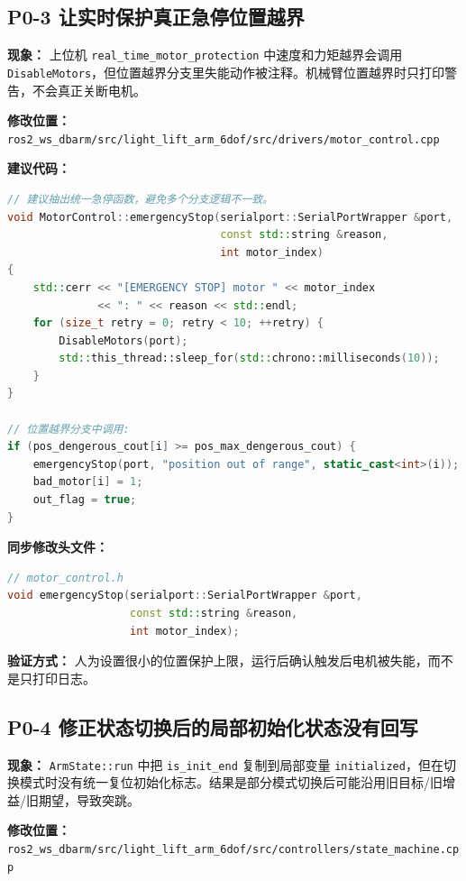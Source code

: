 \documentclass[UTF8,a4paper,11pt]{ctexart}
\begin{document}
\subsection{P0-3 让实时保护真正急停位置越界}

\textbf{现象：} 上位机 \verb|real_time_motor_protection| 中速度和力矩越界会调用 \verb|DisableMotors|，但位置越界分支里失能动作被注释。机械臂位置越界时只打印警告，不会真正关断电机。

\textbf{修改位置：} \verb|ros2_ws_dbarm/src/light_lift_arm_6dof/src/drivers/motor_control.cpp|

\textbf{建议代码：}
\begin{lstlisting}[language=C++]
// 建议抽出统一急停函数，避免多个分支逻辑不一致。
void MotorControl::emergencyStop(serialport::SerialPortWrapper &port,
                                 const std::string &reason,
                                 int motor_index)
{
    std::cerr << "[EMERGENCY STOP] motor " << motor_index
              << ": " << reason << std::endl;
    for (size_t retry = 0; retry < 10; ++retry) {
        DisableMotors(port);
        std::this_thread::sleep_for(std::chrono::milliseconds(10));
    }
}

// 位置越界分支中调用:
if (pos_dengerous_cout[i] >= pos_max_dengerous_cout) {
    emergencyStop(port, "position out of range", static_cast<int>(i));
    bad_motor[i] = 1;
    out_flag = true;
}
\end{lstlisting}

\textbf{同步修改头文件：}
\begin{lstlisting}[language=C++]
// motor_control.h
void emergencyStop(serialport::SerialPortWrapper &port,
                   const std::string &reason,
                   int motor_index);
\end{lstlisting}

\textbf{验证方式：} 人为设置很小的位置保护上限，运行后确认触发后电机被失能，而不是只打印日志。

\subsection{P0-4 修正状态切换后的局部初始化状态没有回写}

\textbf{现象：} \verb|ArmState::run| 中把 \verb|is_init_end| 复制到局部变量 \verb|initialized|，但在切换模式时没有统一复位初始化标志。结果是部分模式切换后可能沿用旧目标/旧增益/旧期望，导致突跳。

\textbf{修改位置：} \verb|ros2_ws_dbarm/src/light_lift_arm_6dof/src/controllers/state_machine.cpp|
\end{document}
